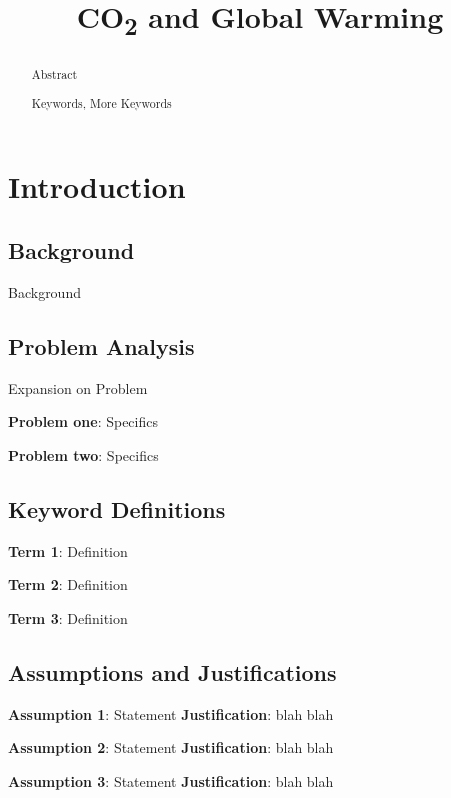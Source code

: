 \documentclass{mcmthesis}
\title{CO\textsubscript{2} and Global Warming}
\begin{document}
    \begin{abstract}
        Abstract

        \begin{keywords}
            Keywords, More Keywords
        \end{keywords}

    \end{abstract}

    \maketitle
    \tableofcontents
    \newpage


    \section{Introduction}

    \subsection{Background}
    Background

    \subsection{Problem Analysis}
    Expansion on Problem

    \noindent\textbf{Problem one}: Specifics

    \noindent\textbf{Problem two}: Specifics

    \subsection{Keyword Definitions}
    \noindent\textbf{Term 1}: Definition

    \noindent\textbf{Term 2}: Definition

    \noindent\textbf{Term 3}: Definition

    \subsection{Assumptions and Justifications}
    \noindent\textbf{Assumption 1}: Statement
    \textbf{Justification}: blah blah

    \noindent\textbf{Assumption 2}: Statement
    \textbf{Justification}: blah blah

    \noindent\textbf{Assumption 3}: Statement
    \textbf{Justification}: blah blah
\end{document}

